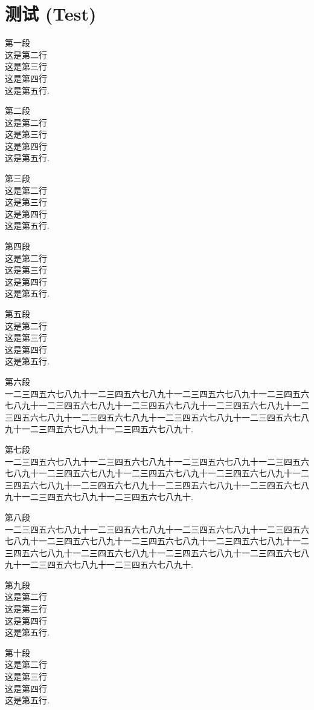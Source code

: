 
\chapter{测试 (Test)}\label{chap:test}

第一段\\
这是第二行\\
这是第三行\\
这是第四行\\
这是第五行.

第二段\\
这是第二行\\
这是第三行\\
这是第四行\\
这是第五行.

第三段\\
这是第二行\\
这是第三行\\
这是第四行\\
这是第五行.

第四段\\
这是第二行\\
这是第三行\\
这是第四行\\
这是第五行.

第五段\\
这是第二行\\
这是第三行\\
这是第四行\\
这是第五行.

第六段\\
一二三四五六七八九十一二三四五六七八九十一二三四五六七八九十一二三四五六七八九十一二三四五六七八九十一二三四五六七八九十一二三四五六七八九十一二三四五六七八九十一二三四五六七八九十一二三四五六七八九十一二三四五六七八九十一二三四五六七八九十一二三四五六七八九十.

第七段\\
一二三四五六七八九十一二三四五六七八九十一二三四五六七八九十一二三四五六七八九十一二三四五六七八九十一二三四五六七八九十一二三四五六七八九十一二三四五六七八九十一二三四五六七八九十一二三四五六七八九十一二三四五六七八九十一二三四五六七八九十一二三四五六七八九十.

第八段\\
一二三四五六七八九十一二三四五六七八九十一二三四五六七八九十一二三四五六七八九十一二三四五六七八九十一二三四五六七八九十一二三四五六七八九十一二三四五六七八九十一二三四五六七八九十一二三四五六七八九十一二三四五六七八九十一二三四五六七八九十一二三四五六七八九十.

第九段\\
这是第二行\\
这是第三行\\
这是第四行\\
这是第五行.

第十段\\
这是第二行\\
这是第三行\\
这是第四行\\
这是第五行.
